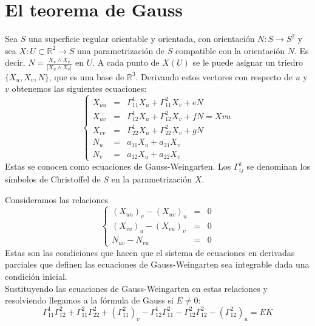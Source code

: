 \section{El teorema de Gauss}

\begin{proposition}
    Sea $S$ una superficie regular orientable y orientada, con orientación $N: S \to S^2$ y sea $X: U \subset \mathbb{R}^2 \to S$ una parametrización de $S$ compatible con la orientación $N$.
    Es decir, $N = \frac{X_u \land X_v}{|X_u \land X_v|}$ en $U$.
    A cada punto de $X(U)$ se le puede asignar un triedro $\{X_u, X_v, N\}$, que es una base de $\mathbb{R}^3$.
    Derivando estos vectores con respecto de $u$ y $v$ obtenemos las siguientes ecuaciones:
    $$\left\{
        \begin{array}{lcl}
            X_{uu} & = & \Gamma^1_{11}X_u + \Gamma^2_{11}X_v + eN         \\
            X_{uv} & = & \Gamma^1_{12}X_u + \Gamma^2_{12}X_v + fN = X{vu} \\
            X_{vv} & = & \Gamma^1_{22}X_u + \Gamma^2_{22}X_v + gN         \\
            N_u    & = & a_{11}X_u + a_{21}X_v                            \\
            N_v    & = & a_{12}X_u + a_{22}X_v
        \end{array}
        \right.$$
    Estas se conocen como ecuaciones de Gauss-Weingarten.
    Los $\Gamma^k_{ij}$ se denominan los símbolos de Christoffel de $S$ en la parametrización $X$.
\end{proposition}

\begin{proposition}
    Consideramos las relaciones
    $$\left\{
        \begin{array}{lcl}
            (X_{uu})_v - (X_{uv})_u & = & 0 \\
            (X_{vv})_u - (X_{vu})_v & = & 0 \\
            N_{uv} - N_{vu}         & = & 0
        \end{array}
        \right.$$
    Estas son las condiciones que hacen que el sistema de ecuaciones en derivadas parciales que definen las ecuaciones de Gauss-Weingarten sea integrable dada una condición inicial.\\
    Sustituyendo las ecuaciones de Gauss-Weingarten en estas relaciones y resolviendo llegamos a la fórmula de Gauss si $E \neq 0$:
    $$\Gamma^1_{11} \Gamma^2_{12} + \Gamma^2_{11} \Gamma^2_{22} + (\Gamma^2_{11})_v - \Gamma^1_{12} \Gamma^2_{11} - \Gamma^2_{12} \Gamma^2_{12} - (\Gamma^2_{12})_u = EK$$
\end{proposition}

